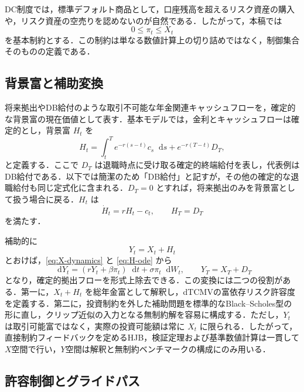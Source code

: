 \documentclass[10pt,a4paper]{article}
\theoremstyle{plain}
\theoremstyle{definition}
\newcommand{\dd}{\mathop{}\!\mathrm{d}}
\begin{document}
DC制度では，標準デフォルト商品として，口座残高を超えるリスク資産の購入や，リスク資産の空売りを認めないのが自然である．したがって，本稿では
\begin{equation}
  0\leq\pi_t\leq X_t
  \label{eq:dc-constraint-x}
\end{equation}
を基本制約とする．この制約は単なる数値計算上の切り詰めではなく，制御集合そのものの定義である．

\subsection{背景富と補助変換}

将来拠出やDB給付のような取引不可能な年金関連キャッシュフローを，確定的な背景富の現在価値として表す．基本モデルでは，金利とキャッシュフローは確定的とし，背景富 $H_t$ を
\begin{equation}
  H_t=\int_t^T e^{-r(s-t)}c_s\dd s+e^{-r(T-t)}D_T,
  \label{eq:H-def}
\end{equation}
と定義する．ここで $D_T$ は退職時点に受け取る確定的終端給付を表し，代表例はDB給付である．以下では簡潔のため「DB給付」と記すが，その他の確定的な退職給付も同じ定式化に含まれる．$D_T=0$ とすれば，将来拠出のみを背景富として扱う場合に戻る．$H_t$ は
\begin{equation}
  \dot H_t=rH_t-c_t,
  \qquad H_T=D_T
  \label{eq:H-ode}
\end{equation}
を満たす．

補助的に
\begin{equation}
  Y_t=X_t+H_t
  \label{eq:Y-def}
\end{equation}
とおけば，\eqref{eq:X-dynamics} と \eqref{eq:H-ode} から
\begin{equation}
  \dd Y_t=(rY_t+\beta\pi_t)\dd t+\sigma\pi_t\dd W_t,
  \qquad Y_T=X_T+D_T
  \label{eq:Y-dynamics}
\end{equation}
となり，確定的拠出フローを形式上除去できる．この変換には二つの役割がある．第一に，$X_t+H_t$ を総年金富として解釈し，dTCMVの富依存リスク許容度を定義する．第二に，投資制約を外した補助問題を標準的なBlack--Scholes型の形に直し，クリップ近似の入力となる無制約解を容易に構成する．ただし，$Y_t$ は取引可能富ではなく，実際の投資可能額は常に $X_t$ に限られる．したがって，直接制約フィードバックを定めるHJB，検証定理および基準数値計算は一貫して $X$空間で行い，$Y$空間は解釈と無制約ベンチマークの構成にのみ用いる．

\subsection{許容制御とグライドパス}
\label{sec:admissible-glide}
\end{document}

